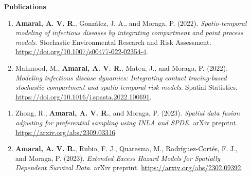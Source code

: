 \documentclass[11pt, ]{article}
\begin{document}
	\vspace{6pt}
	
	{\Large \textbf{Publications}} \vspace{-3pt}
	
	
	\vspace{9pt}\vspace{-5pt}
	
	\begin{enumerate}
		\item  \textbf{Amaral, A. V. R.}, González, J. A., and Moraga, P. (2022). \textit{Spatio-temporal modeling of infectious diseases by integrating compartment and point process models}. Stochastic Environmental Research and Risk Assessment. \href{https://doi.org/10.1007/s00477-022-02354-4}{\url{https://doi.org/10.1007/s00477-022-02354-4}}.
		\item  Mahmood, M., \textbf{Amaral, A. V. R.}, Mateu, J., and Moraga, P. (2022). \textit{Modeling infectious disease dynamics: Integrating contact tracing-based stochastic compartment and spatio-temporal risk models}. Spatial Statistics. \href{https://doi.org/10.1016/j.spasta.2022.100691}{\url{https://doi.org/10.1016/j.spasta.2022.100691}}.
	\end{enumerate}
	
	\vspace{3pt}\vspace{-5pt}
	
	\begin{enumerate}
		\item  Zhong, R., \textbf{Amaral, A. V. R.}, and Moraga, P. (2023).\textit{ Spatial data fusion adjusting for preferential sampling using INLA and SPDE}. arXiv preprint. \href{https://arxiv.org/abs/2309.03316}{\url{https://arxiv.org/abs/2309.03316}}
		\item  \textbf{Amaral, A. V. R.}, Rubio, F. J., Quaresma, M., Rodríguez-Cortés, F. J., and Moraga, P. (2023). \textit{Extended Excess Hazard Models for Spatially Dependent Survival Data}. arXiv preprint. \href{https://arxiv.org/abs/2302.09392}{\url{https://arxiv.org/abs/2302.09392}}.
	\end{enumerate}
	
	\vspace{3pt}\vspace{-5pt}
	
\end{document}
